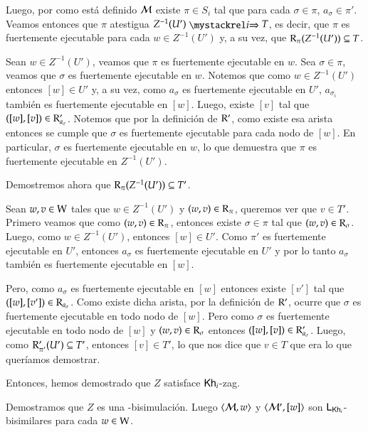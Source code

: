 \begin{demostracion}
\begin{itemize}
        Luego, por como está definido $\mathcal{M}$ existe $\pi \in S_i$ tal que para cada $\sigma \in \pi$, $a_\sigma \in \pi'$. 
        Veamos entonces que $\pi$ atestigua $Z^{-1}(U') \ultsExecAgi T$, es decir, que $\pi$ es fuertemente ejecutable para cada $w \in Z^{-1}(U')$ 
        y, a su vez, que $\mathrm{R}_\pi(Z^{-1}(U')) \subseteq T$.

        Sean $w \in Z^{-1}(U')$, veamos que $\pi$ es fuertemente ejecutable en $w$. Sea $\sigma \in \pi$, veamos que $\sigma$ es fuertemente ejecutable 
        en $w$. Notemos que como $w \in Z^{-1}(U')$ entonces $[w] \in U'$ y, a su vez, como $a_\sigma$ es fuertemente ejecutable en $U'$, $a_{\sigma_i}$ también es fuertemente ejecutable en $[w]$. 
        Luego, existe $[v]$ tal que $([w],[v]) \in \mathrm{R}'_{a_\sigma}$. Notemos que por la definición de $\mathrm{R}'$, como existe esa arista entonces se cumple que $\sigma$ es fuertemente ejecutable 
        para cada nodo de $[w]$. En particular, $\sigma$ es fuertemente ejecutable en $w$, lo que demuestra que $\pi$ es fuertemente ejecutable 
        en $Z^{-1}(U')$.

        Demostremos ahora que $\mathrm{R}_{\pi}(Z^{-1}(U')) \subseteq T'$. 

        Sean $w, v \in \mathrm{W}$ tales que $w \in Z^{-1}(U')$ y $(w,v) \in \mathrm{R}_\pi$, queremos ver que $v \in T'$. Primero veamos que como $(w,v) \in \mathrm{R}_\pi$, 
        entonces existe $\sigma \in \pi$ tal que $(w,v) \in \mathrm{R}_\sigma$. Luego, como $w \in Z^{-1}(U')$, entonces $[w] \in U'$. Como $\pi'$ es fuertemente 
        ejecutable en $U'$, entonces $a_\sigma$ es fuertemente ejecutable en $U'$ y por lo tanto $a_\sigma$ también es fuertemente ejecutable en $[w]$.
        
        Pero, como $a_\sigma$ es fuertemente ejecutable en $[w]$ entonces existe $[v']$ tal que $([w],[v']) \in \mathrm{R}_{a_\sigma}$. 
        Como existe dicha arista, por la definición de $\mathrm{R}'$, ocurre que $\sigma$ es fuertemente ejecutable en todo nodo de $[w]$. 
        Pero como $\sigma$ es fuertemente ejecutable en todo nodo de $[w]$ y $(w,v) \in \mathrm{R}_\sigma$ entonces $([w],[v]) \in \mathrm{R}'_{a_\sigma}$. 
        Luego, como $\mathrm{R}'_{\pi'}(U') \subseteq T'$, entonces $[v] \in T'$, lo que nos dice que $v \in T$ que era lo que queríamos demostrar.

        Entonces, hemos demostrado que $Z$ satisface $\mathsf{Kh}_i$-zag.
    \end{itemize}
    Demostramos que $Z$ es una \KHilogic-bisimulación. Luego $\langle \mathcal{M},w \rangle$ y $\langle \mathcal{M}',[w] \rangle$ son $\mathsf{L}_{\mathsf{Kh}_i}$-bisimilares para cada $w \in \mathrm{W}$.
\end{demostracion}



